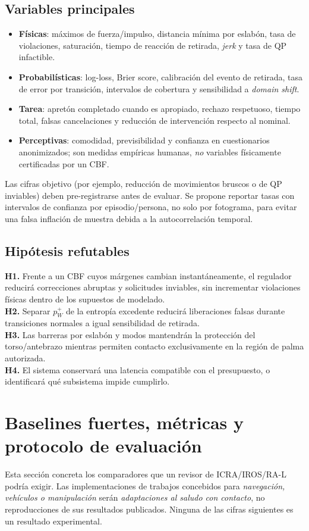 \documentclass[10pt,a4paper,twocolumn]{article}
\begin{document}
\subsection{Variables principales}
\begin{itemize}
\item \textbf{Físicas}: máximos de fuerza/impulso, distancia mínima por eslabón, tasa de violaciones, saturación, tiempo de reacción de retirada, \emph{jerk} y tasa de QP infactible.
\item \textbf{Probabilísticas}: log-loss, Brier score, calibración del evento de retirada, tasa de error por transición, intervalos de cobertura y sensibilidad a \emph{domain shift}.
\item \textbf{Tarea}: apretón completado cuando es apropiado, rechazo respetuoso, tiempo total, falsas cancelaciones y reducción de intervención respecto al nominal.
\item \textbf{Perceptivas}: comodidad, previsibilidad y confianza en cuestionarios anonimizados; son medidas empíricas humanas, \emph{no} variables físicamente certificadas por un CBF.
\end{itemize}

Las cifras objetivo (por ejemplo, reducción de movimientos bruscos o de QP inviables) deben pre-registrarse antes de evaluar. Se propone reportar tasas con intervalos de confianza por episodio/persona, no solo por fotograma, para evitar una falsa inflación de muestra debida a la autocorrelación temporal.

\subsection{Hipótesis refutables}
\textbf{H1.} Frente a un CBF cuyos márgenes cambian instantáneamente, el regulador reducirá correcciones abruptas y solicitudes inviables, sin incrementar violaciones físicas dentro de los supuestos de modelado.\\
\textbf{H2.} Separar $p^+_W$ de la entropía excedente reducirá liberaciones falsas durante transiciones normales a igual sensibilidad de retirada.\\
\textbf{H3.} Las barreras por eslabón y modos mantendrán la protección del torso/antebrazo mientras permiten contacto exclusivamente en la región de palma autorizada.\\
\textbf{H4.} El sistema conservará una latencia compatible con el presupuesto, o identificará qué subsistema impide cumplirlo.

\section{Baselines fuertes, métricas y protocolo de evaluación}
\label{sec:benchmark}
Esta sección concreta los comparadores que un revisor de ICRA/IROS/RA-L podría exigir. Las implementaciones de trabajos concebidos para \emph{navegación, vehículos o manipulación} serán \emph{adaptaciones al saludo con contacto}, no reproducciones de sus resultados publicados. Ninguna de las cifras siguientes es un resultado experimental.
\end{document}
